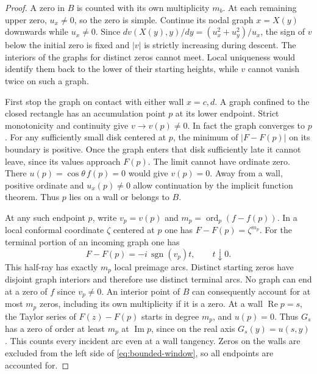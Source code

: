 \documentclass[11pt,a4paper]{article}
\numberwithin{equation}{section}
\renewcommand{\Re}{\operatorname{Re}}\renewcommand{\Im}{\operatorname{Im}}
\begin{document}
\begin{proof}
A zero in $B$ is counted with its own multiplicity $m_b$. At each
remaining upper zero, $u_x\ne0$, so the zero is simple. Continue its
nodal graph $x=X(y)$ downwards while $u_x\ne0$. Since
$d v(X(y),y)/dy=(u_x^2+u_y^2)/u_x$, the sign of $v$ below the
initial zero is fixed and $|v|$ is strictly increasing during descent.
The interiors of the graphs for distinct zeros cannot meet. Local
uniqueness would identify them back to the lower of their starting
heights, while $v$ cannot vanish twice on such a graph.

First stop the graph on contact with either wall $x=c,d$. A graph
confined to the closed rectangle has an accumulation point $p$ at its
lower endpoint. Strict monotonicity and continuity give $v\to v(p)\ne0$.
In fact the graph converges to $p$. For any sufficiently small disk
centered at $p$, the minimum of $|F-F(p)|$ on its boundary is positive.
Once the graph enters that disk sufficiently late it cannot leave,
since its values approach $F(p)$. The limit cannot have ordinate zero.
There $u(p)=\cos\theta\,f(p)=0$ would give $v(p)=0$. Away from a wall,
positive ordinate and $u_x(p)\ne0$ allow continuation by the implicit
function theorem. Thus $p$ lies on a wall or belongs to $B$.

At any such endpoint $p$, write $v_p=v(p)$ and
$m_p=\operatorname{ord}_p(f-f(p))$. In a local conformal coordinate
$\zeta$ centered at $p$ one has $F-F(p)=\zeta^{m_p}$. For the terminal
portion of an incoming graph one has
\[
 F-F(p)=-i\,\operatorname{sgn}(v_p)t,\qquad t\downarrow0.
\]
This half-ray has exactly $m_p$ local preimage arcs. Distinct starting
zeros have disjoint graph interiors and therefore use distinct terminal
arcs. No graph can end at a zero of $f$ since $v_p\ne0$. An interior
point of $B$ can consequently account for at most $m_p$ zeros, including
its own multiplicity if it is a zero. At a wall $\Re p=s$, the Taylor
series of $F(z)-F(p)$ starts in degree $m_p$, and $u(p)=0$. Thus
$G_s$ has a zero of order at least $m_p$ at $\Im p$, since on the real
axis $G_s(y)=u(s,y)$. This counts every incident arc even at a wall
tangency. Zeros on the walls are excluded from the left side of
\eqref{eq:bounded-window}, so all endpoints are accounted for.


\end{proof}
\end{document}
